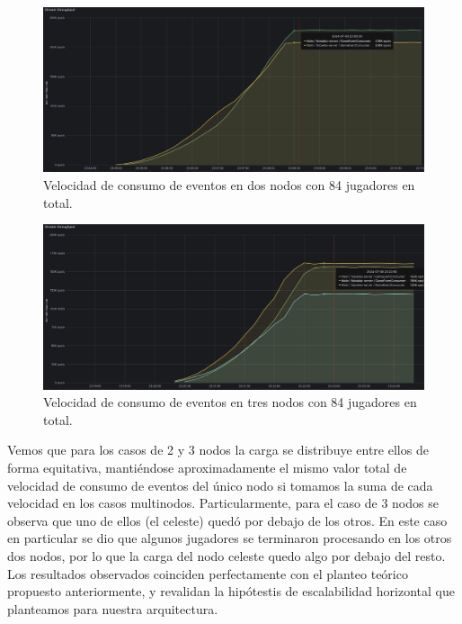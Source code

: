 \begin{figure}[htbp]
    \centering
    \includegraphics[width=1\textwidth]{../assets/fiubakka-consumer-two-node-metrics.png}
    \caption{Velocidad de consumo de eventos en dos nodos con 84 jugadores en total.}
\end{figure}

\newpage

\begin{figure}[htbp]
    \centering
    \includegraphics[width=1\textwidth]{../assets/fiubakka-consumer-three-node-metrics.png}
    \caption{Velocidad de consumo de eventos en tres nodos con 84 jugadores en total.}
\end{figure}

Vemos que para los casos de 2 y 3 nodos la carga se distribuye entre ellos de forma equitativa, mantiéndose aproximadamente el mismo valor total de velocidad de consumo de eventos del único nodo si tomamos la suma
de cada velocidad en los casos multinodos. Particularmente, para el caso de 3 nodos se observa que uno de ellos (el celeste) quedó por debajo de los otros. En este caso en particular se dio que algunos jugadores se terminaron procesando
en los otros dos nodos, por lo que la carga del nodo celeste quedo algo por debajo del resto. Los resultados observados coinciden perfectamente con el planteo teórico propuesto anteriormente, y revalidan la hipótestis de escalabilidad
horizontal que planteamos para nuestra arquitectura.

